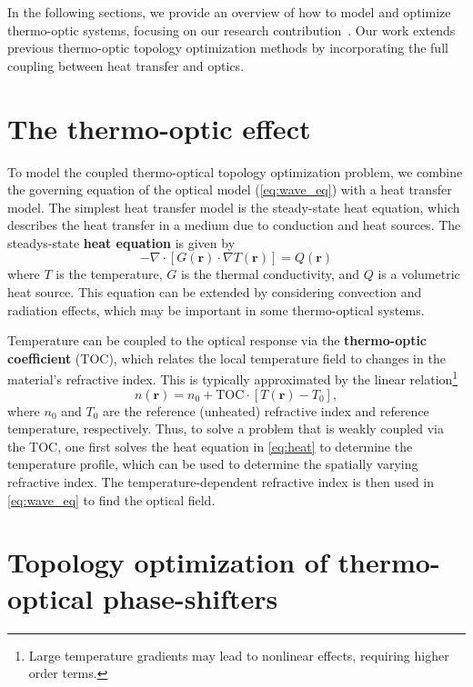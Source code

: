 In the following sections, we provide an overview of how to model and optimize thermo-optic systems, 
focusing on our research contribution~\cite{ownpub0}. Our work extends previous thermo-optic topology 
optimization methods by incorporating the full coupling between heat transfer and optics.

\section{The thermo-optic effect}\label{sec:to_effect}

To model the coupled thermo-optical topology optimization problem, we combine the governing equation of the optical model (\eqref{eq:wave_eq})
with a heat transfer model. The simplest heat transfer model is the steady-state heat equation, which describes the
heat transfer in a medium due to conduction and heat sources. The steadys-state \textbf{heat equation} is given by
\begin{equation}\label{eq:heat}
 -\nabla \cdot \left[ G(\mathbf{r})\cdot \nabla T(\mathbf{r}) \right] = Q(\mathbf{r})
\end{equation}
where $T$ is the temperature, $G$ is the thermal conductivity, and $Q$ is a volumetric heat source. This equation can be
extended by considering convection and radiation effects, which may be important in some thermo-optical systems.

Temperature can be coupled to the optical response via the \textbf{thermo-optic coefficient} (TOC), which relates the local temperature field
to changes in the material's refractive index. This is typically approximated by the linear relation\footnote{Large temperature gradients may lead to nonlinear effects, requiring higher order terms.}
\begin{equation}
n(\mathbf{r}) = n_0 + \text{TOC} \cdot \left[T(\mathbf{r}) - T_0\right],
\end{equation}
where $n_0$ and $T_0$ are the reference (unheated) refractive index and reference temperature, respectively. Thus, to solve a problem that is weakly coupled via the TOC, one first solves the heat equation
in \eqref{eq:heat}
to determine the temperature profile, which can be used to determine
the spatially varying refractive index. The temperature-dependent refractive index is then used in \eqref{eq:wave_eq} to find the optical field.

\section{Topology optimization of thermo-optical phase-shifters~\cite{ownpub0}}\label{sec:TOPS}

